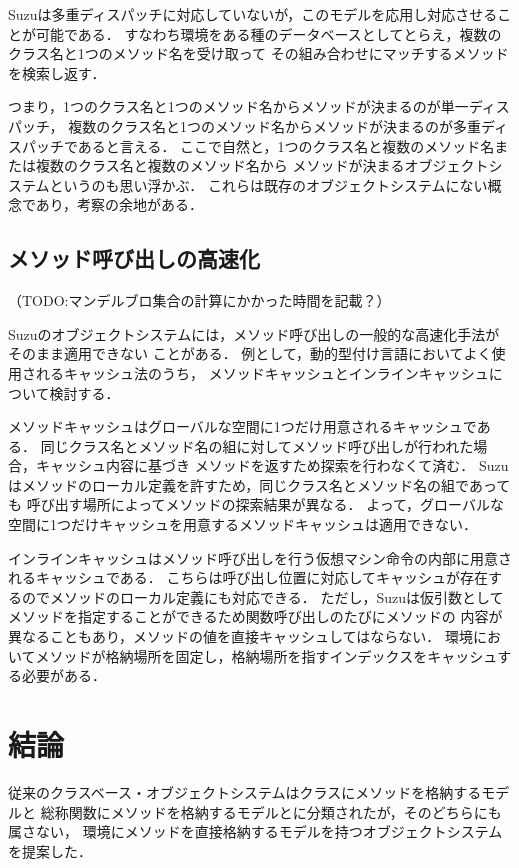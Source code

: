 \documentclass{ipsjprosym}
\begin{document}
Suzuは多重ディスパッチに対応していないが，このモデルを応用し対応させることが可能である．
すなわち環境をある種のデータベースとしてとらえ，複数のクラス名と1つのメソッド名を受け取って
その組み合わせにマッチするメソッドを検索し返す．

つまり，1つのクラス名と1つのメソッド名からメソッドが決まるのが単一ディスパッチ，
複数のクラス名と1つのメソッド名からメソッドが決まるのが多重ディスパッチであると言える．
ここで自然と，1つのクラス名と複数のメソッド名または複数のクラス名と複数のメソッド名から
メソッドが決まるオブジェクトシステムというのも思い浮かぶ．
これらは既存のオブジェクトシステムにない概念であり，考察の余地がある．

\subsection{メソッド呼び出しの高速化}

（TODO:マンデルブロ集合の計算にかかった時間を記載？）

Suzuのオブジェクトシステムには，メソッド呼び出しの一般的な高速化手法がそのまま適用できない
ことがある．
例として，動的型付け言語においてよく使用されるキャッシュ法\cite{Onodera:1997-04-15}のうち，
メソッドキャッシュとインラインキャッシュについて検討する．

メソッドキャッシュはグローバルな空間に1つだけ用意されるキャッシュである．
同じクラス名とメソッド名の組に対してメソッド呼び出しが行われた場合，キャッシュ内容に基づき
メソッドを返すため探索を行わなくて済む．
Suzuはメソッドのローカル定義を許すため，同じクラス名とメソッド名の組であっても
呼び出す場所によってメソッドの探索結果が異なる．
よって，グローバルな空間に1つだけキャッシュを用意するメソッドキャッシュは適用できない．

インラインキャッシュはメソッド呼び出しを行う仮想マシン命令の内部に用意されるキャッシュである．
こちらは呼び出し位置に対応してキャッシュが存在するのでメソッドのローカル定義にも対応できる．
ただし，Suzuは仮引数としてメソッドを指定することができるため関数呼び出しのたびにメソッドの
内容が異なることもあり，メソッドの値を直接キャッシュしてはならない．
環境においてメソッドが格納場所を固定し，格納場所を指すインデックスをキャッシュする必要がある．

\section{結論}

従来のクラスベース・オブジェクトシステムはクラスにメソッドを格納するモデルと
総称関数にメソッドを格納するモデルとに分類されたが，そのどちらにも属さない，
環境にメソッドを直接格納するモデルを持つオブジェクトシステムを提案した．
\end{document}
